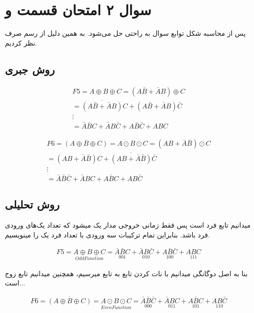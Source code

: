 
\section{سوال ۲ امتحان قسمت  و }

پس از محاسبه شکل  توابع سوال به راحتی حل می‌شود.
به همین دلیل از رسم  صرف نظر کردیم.

\subsection{روش جبری}

\begin{align}
  F5 = A \oplus B \oplus C = (A\bar{B} + \bar{A}B) \oplus C          \\
  = \overline{(A\bar{B} + \bar{A}B)}C + (A\bar{B} + \bar{A}B)\bar{C} \\
  \vdots                                                             \\
  = \bar{A}\bar{B}C + \bar{A}B\bar{C} + A\bar{B}\bar{C} + ABC
\end{align}

\begin{align}
  F6 = \overline{(A \oplus B \oplus C)} = A \odot B \odot C = (AB + \bar{A}\bar{B}) \odot C \\
  = (AB + \bar{A}\bar{B})C + \overline{(AB + \bar{A}\bar{B})}\bar{C}                        \\
  \vdots                                                                                    \\
  = \bar{A}\bar{B}\bar{C} + \bar{A}BC + A\bar{B}C + AB\bar{C}
\end{align}

\subsection{روش تحلیلی}

میدانیم  تابع فرد است پس فقط زمانی خروجی مدار یک میشود که تعداد یک‌های ورودی فرد باشد.
بنابراین تمام ترکیبات سه ورودی با تعداد فرد یک را مینویسیم.

\begin{align}
  F5 = \underset{OddFunction}{A \oplus B \oplus C}
  = \underset{001}{\bar{A}\bar{B}C} + \underset{010}{\bar{A}B\bar{C}} + \underset{100}{A\bar{B}\bar{C}} + \underset{111}{ABC}
\end{align}

بنا به اصل دوگانگی میدانیم با نات کردن تابع  به تابع  میرسیم،
همچنین میدانیم  تابع زوج است...

\begin{align}
  F6 = \overline{(A \oplus B \oplus C)}
  = \underset{EvenFunction}{A \odot B \odot C}
  = \underset{000}{\bar{A}\bar{B}\bar{C}} + \underset{011}{\bar{A}BC} + \underset{101}{A\bar{B}C} + \underset{110}{AB\bar{C}}
\end{align}
